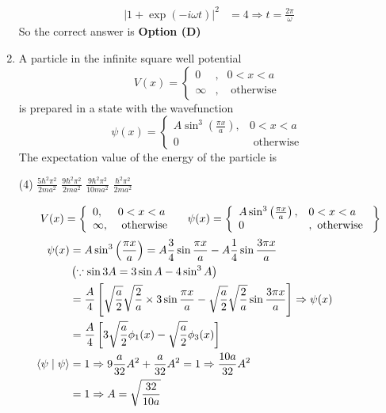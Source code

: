 \begin{enumerate}
\begin{answer}
\begin{align*}
|1+\exp (-i \omega t)|^{2}&=4 \Rightarrow t=\frac{2 \pi}{\omega}
\end{align*}
So the correct answer is \textbf{Option (D)}
\end{answer}
	\item A particle in the infinite square well potential
	$$
	V(x)=\left\{\begin{array}{lll}
	0 & , & 0<x<a \\
	\infty & , & \text { otherwise }
	\end{array}\right.
	$$
	is prepared in a state with the wavefunction
	$$
	\psi(x)=\left\{\begin{array}{ll}
	A \sin ^{3}\left(\frac{\pi x}{a}\right), & 0<x<a \\
	0 & \text { otherwise }
	\end{array}\right.
	$$
	The expectation value of the energy of the particle is
{	}
\begin{tasks}(4)
\task[\textbf{A.}] $\frac{5 \hbar^{2} \pi^{2}}{2 m a^{2}}$
\task[\textbf{B.}]  $\frac{9 \hbar^{2} \pi^{2}}{2 m a^{2}}$
\task[\textbf{C.}] $\frac{9 \hbar^{2} \pi^{2}}{10 m a^{2}}$
\task[\textbf{D.}] $\frac{\hbar^{2} \pi^{2}}{2 m a^{2}}$
\end{tasks}
\begin{answer}
\begin{align*}
\intertext{	$V(x)=\left\{\begin{array}{ll}0, & 0<x<a \\ \infty, & \text { otherwise }\end{array} \quad \psi(x)=\left\{\begin{array}{ll}A \sin ^{3}\left(\frac{\pi x}{a}\right), & 0<x<a \\ 0 & , \text { otherwise }\end{array}\right\}\right.$}
\psi(x)&=A \sin ^{3}\left(\frac{\pi x}{a}\right)=A \frac{3}{4} \sin \frac{\pi x}{a}-A \frac{1}{4} \sin \frac{3 \pi x}{a} \\&\left(\because \sin 3 A=3 \sin A-4 \sin ^{3} A\right)\\
&=\frac{A}{4}\left[\sqrt{\frac{a}{2}} \sqrt{\frac{2}{a}} \times 3 \sin \frac{\pi x}{a}-\sqrt{\frac{a}{2}} \sqrt{\frac{2}{a}} \sin \frac{3 \pi x}{a}\right] \Rightarrow \psi(x)\\&=\frac{A}{4}\left[3 \sqrt{\frac{a}{2}} \phi_{1}(x)-\sqrt{\frac{a}{2}} \phi_{3}(x)\right]\\
\langle\psi \mid \psi\rangle&=1 \Rightarrow 9 \frac{a}{32} A^{2}+\frac{a}{32} A^{2}=1 \Rightarrow \frac{10 a}{32} A^{2}\\&=1 \Rightarrow A=\sqrt{\frac{32}{10 a}}\\

\end{align*}
\end{answer}
\end{enumerate}
